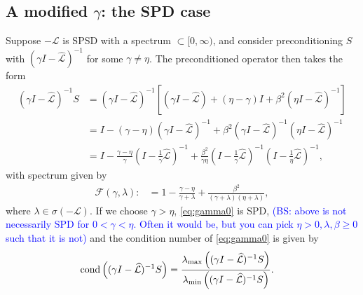 \documentclass[a4paper,10pt]{article}
\newcommand{\tcb}{\textcolor{blue}}
\begin{document}
\subsection{A modified $\gamma$: the SPD case}

Suppose $-\mathcal{L}$ is SPSD with a spectrum $\subset [0,\infty)$, and
consider preconditioning $S$ with $(\gamma I- \widehat{\mathcal{L}})^{-1}$ for
some $\gamma \neq \eta$. The preconditioned operator then takes the form
%
\begin{align}\nonumber
(\gamma I- \widehat{\mathcal{L}})^{-1}S & = (\gamma I - \widehat{\mathcal{L}})^{-1}
	\left[ (\gamma I - \widehat{\mathcal{L}}) + (\eta-\gamma)I + \beta^2 (\eta I - \widehat{\mathcal{L}})^{-1}\right] \\
& = I - (\gamma - \eta)( \gamma I- \widehat{\mathcal{L}})^{-1} + 
	\beta^2( \gamma I- \widehat{\mathcal{L}})^{-1}
		( \eta I-\widehat{\mathcal{L}})^{-1} \nonumber\\
& = I - \frac{\gamma - \eta}{\gamma} ( I- \tfrac{1}{\gamma}\widehat{\mathcal{L}})^{-1} + 
	\frac{\beta^2}{\gamma\eta}( I- \tfrac{1}{\gamma}\widehat{\mathcal{L}})^{-1}
		( I- \tfrac{1}{\eta}\widehat{\mathcal{L}})^{-1},\label{eq:gamma0}
\end{align}
%
with spectrum given by
%
\begin{align}\label{eq:eig_gamma}
\mathcal{F}(\gamma,\lambda) :&= 
	1 - \frac{\gamma-\eta}{\gamma + \lambda} + \frac{\beta^2}{(\gamma + \lambda)(\eta+\lambda)},
\end{align}
%
where $\lambda\in\sigma(-\mathcal{L})$. If we choose $\gamma>\eta$,
\eqref{eq:gamma0} is SPD, \tcb{(BS: above is not necessarily SPD for $0<\gamma<\eta$.
Often it would be, but you can pick $\eta>0,\lambda,\beta\geq 0$ such that
it is not)} and the condition number of \eqref{eq:gamma0} is given by
%
\begin{align}\label{eq:cond0}
\textnormal{cond}\left((\gamma I- \widehat{\mathcal{L}})^{-1}S\right) & =
	\frac{\lambda_{\max}\left((\gamma I- \widehat{\mathcal{L}})^{-1}S\right)}
		{\lambda_{\min}\left((\gamma I- \widehat{\mathcal{L}})^{-1}S\right)}.
\end{align}
\end{document}
